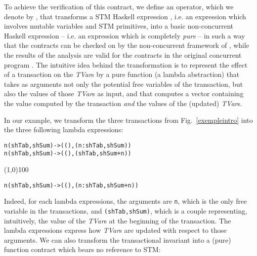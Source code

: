 \documentclass[submission,copyright,creativecommons]{eptcs}
\begin{document}
To achieve the verification of this contract, we define an operator, which we denote by  , that transforms a STM Haskell expression , i.e. an expression which involves mutable variables and STM primitives, into a basic non-concurrent Haskell  expression  -- i.e. an expression which is completely \emph{pure} -- in such a way that the contracts can be checked on  by the non-concurrent framework of \cite{static-contract-checking}, while the results of the analysis are valid for the contracts in the original concurrent program .
The intuitive idea behind the transformation is to represent the effect of a transaction on the \emph{TVar}s by a pure function (a lambda abstraction) that takes as arguments not only the potential free variables of the transaction, but also the values of those \emph{TVar}s as input, and that computes a vector containing the value computed by the transaction \emph{and} the values of the (updated) \emph{TVar}s. 

\newcommand\bslash{\symbol{`\\}}

In our example, we transform the three transactions from Fig.~\ref{exempleintro} into the three following lambda expressions:

\begin{footnotesize}
\begin{alltt}
{\bslash}n (shTab,shSum) -> ((),(n:shTab,shSum))    
{\bslash}n (shTab,shSum) -> ((),(shTab,shSum+n))    
\end{alltt}
\end{footnotesize}
\begin{center}
\line(1,0){100}
\end{center}
\begin{footnotesize}
\begin{alltt}
{\bslash}n (shTab,shSum) -> ((),(n:shTab,shSum+n))  
\end{alltt}
\end{footnotesize}
Indeed, for each lambda expressions, the arguments are \texttt{n}, which is the only free variable in the transactions, and \texttt{(shTab,shSum)}, which is a couple representing, intuitively, the value of the \emph{TVar}s at the beginning of the transaction. The lambda expressions express how \emph{TVar}s are updated with respect to those arguments.   
We can also transform the transactional invariant into a (pure) function contract
which bears no reference to STM:
\end{document}
